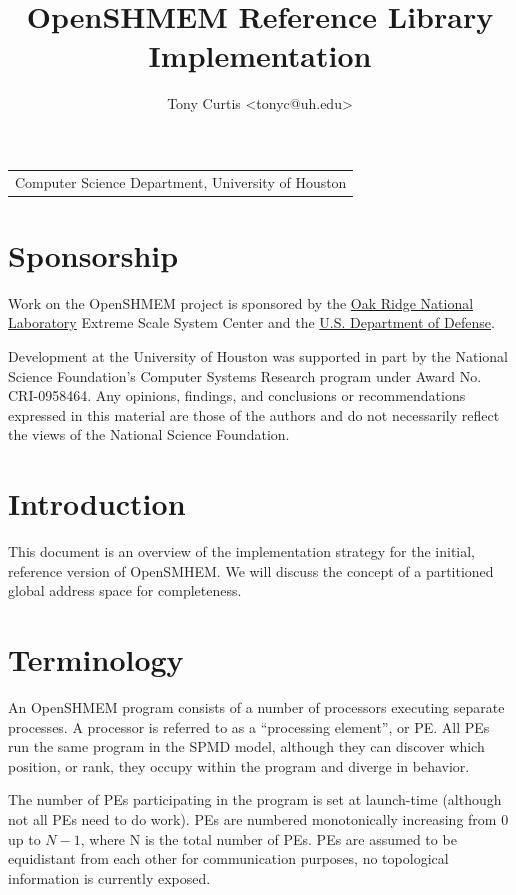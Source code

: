 \documentclass[english]{article}
\newcommand{\lyxrightaddress}[1]{
\par {\raggedleft \begin{tabular}{l}\ignorespaces
#1
\end{tabular}
\vspace{1.4em}
\par}
}
\newcommand{\openshmem} {\mbox{OpenSHMEM}\xspace}
\begin{document}
\title{\openshmem Reference Library Implementation}
\author{Tony Curtis <tonyc@uh.edu>}
\maketitle
\lyxrightaddress{Computer Science Department, University of Houston}

\pagebreak{}
\tableofcontents{}
\pagebreak{}

\section{Sponsorship}

Work on the \openshmem project is sponsored by the
\href{http://www.ornl.gov/}{Oak Ridge National Laboratory} Extreme
Scale System Center and the \href{http://www.defense.gov/}{U.S. Department
of Defense}.

Development at the University of Houston was supported in part by the
National Science Foundation's Computer Systems Research program under
Award No. CRI-0958464.  Any opinions, findings, and conclusions or
recommendations expressed in this material are those of the authors
and do not necessarily reflect the views of the National Science
Foundation.

\section{Introduction}

This document is an overview of the implementation strategy for the
initial, reference version of OpenSMHEM. We will discuss the concept
of a partitioned global address space for completeness.

\section{Terminology}

An \openshmem program consists of a number of processors executing
separate processes. A processor is referred to as a ``processing
element'', or PE. All PEs run the same program in the SPMD model,
although they can discover which position, or rank, they occupy within
the program and diverge in behavior.

The number of PEs participating in the program is set at launch-time
(although not all PEs need to do work). PEs are numbered monotonically
increasing from 0 up to $N-1$, where N is the total number of PEs.
PEs are assumed to be equidistant from each other for communication
purposes, no topological information is currently exposed.
\end{document}
